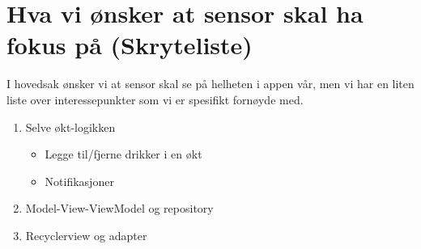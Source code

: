 \section{Hva vi ønsker at sensor skal ha fokus på (Skryteliste)}
I hovedsak ønsker vi at sensor skal se på helheten i appen vår, men vi har en liten liste over interessepunkter som vi er spesifikt fornøyde med.

\begin{enumerate}
  \item Selve økt-logikken
  \begin{itemize}
    \item Legge til/fjerne drikker i en økt
    \item Notifikasjoner
  \end{itemize}
  \item Model-View-ViewModel og repository
  \item Recyclerview og adapter
\end{enumerate}